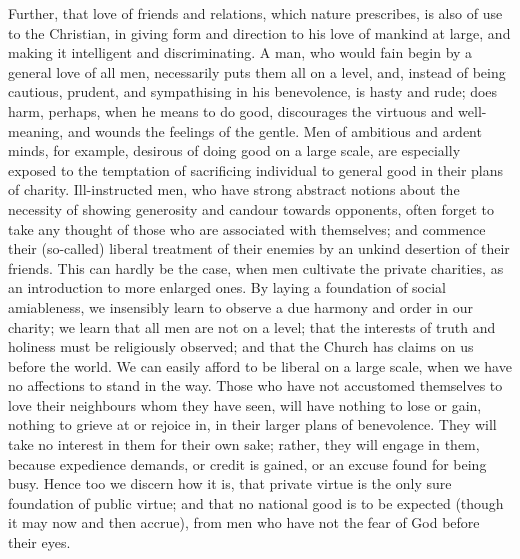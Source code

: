 Further, that love of friends and relations, which nature
prescribes, is also of use to the Christian, in giving form and
direction to his love of mankind at large, and making it intelligent
and discriminating. A man, who would fain begin by a general love of
all men, necessarily puts them all on a level, and, instead of being
cautious, prudent, and sympathising in his benevolence, is hasty and
rude; does harm, perhaps, when he means to do good, discourages the
virtuous and well-meaning, and wounds the feelings of the gentle. Men
of ambitious and ardent minds, for example, desirous of doing good on
a large scale, are especially exposed to the temptation of sacrificing
individual to general good in their plans of charity. Ill-instructed
men, who have strong abstract notions about the necessity of showing
generosity and candour towards opponents, often forget to take any
thought of those who are associated with themselves; and commence
their (so-called) liberal treatment of their enemies by an unkind
desertion of their friends. This can hardly be the case, when men
cultivate the private charities, as an introduction to more enlarged
ones. By laying a foundation of social amiableness, we insensibly
learn to observe a due harmony and order in our charity; we learn that
all men are not on a level; that the interests of truth and holiness
must be religiously observed; and that the Church has claims on us
before the world. We can easily afford to be liberal on a large scale,
when we have no affections to stand in the way. Those who have not
accustomed themselves to love their neighbours whom they have seen,
will have nothing to lose or gain, nothing to grieve at or rejoice in,
in their larger plans of benevolence. They will take no interest in
them for their own sake; rather, they will engage in them, because
expedience demands, or credit is gained, or an excuse found for being
busy. Hence too we discern how it is, that private virtue is the only
sure foundation of public virtue; and that no national good is to be
expected (though it may now and then accrue), from men who have not
the fear of God before their eyes.

